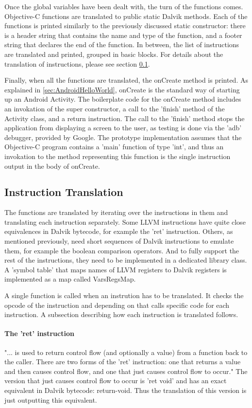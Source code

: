 \documentclass[parskip]{cs4rep}
\begin{document}
Once the global variables have been dealt with, the turn of the functions comes. Objective-C functions are translated to public static Dalvik methods. Each of the functions is printed similarly to the previously discussed static constructor: there is a header string that contains the name and type of the function, and a footer string that declares the end of the function. In between, the list of instructions are translated and printed, grouped in basic blocks. For details about the translation of instructions, please see section \ref{sec:instructionTranslation}.

Finally, when all the functions are translated, the onCreate method is printed. As explained in \ref{sec:AndroidHelloWorld}, onCreate is the standard way of starting up an Android Activity. The boilerplate code for the onCreate method includes an invokation of the super constructor, a call to the 'finish' method of the Activity class, and a return instruction. The call to the 'finish' method stops the application from displaying a screen to the user, as testing is done via the 'adb' debugger, provided by Google. The prototype implementation assumes that the Objective-C program contains a 'main' function of type 'int', and thus an invokation to the method representing this function is the single instruction output in the body of onCreate.

\subsection{Instruction Translation} \label{sec:instructionTranslation}

The functions are translated by iterating over the instructions in them and translating each instruction separately. Some LLVM instructions have quite close equivalences in Dalvik bytecode, for example the 'ret' instruction. Others, as mentioned previously, need short sequences of Dalvik instructions to emulate them, for example the boolean comparison operators. And to fully support the rest of the instructions, they need to be implemented in a dedicated library class. A 'symbol table' that maps names of LLVM registers to Dalvik registers is implemented as a map called VarsRegsMap. 

A single function is called when an instrution has to be translated. It checks the opcode of the instruction and depending on that calls specific code for each instruction. A subsection describing how each instruction is translated follows.

\paragraph{The 'ret' instruction} "... is used to return control flow (and optionally a value) from a function back to the caller. There are two forms of the 'ret' instruction: one that returns a value and then causes control flow, and one that just causes control flow to occur."\cite{P11} The version that just causes control flow to occur is 'ret void' and has an exact equivalent in Dalvik bytecode: return-void. Thus the translation of this version is just outputting this equivalent.
\end{document}

